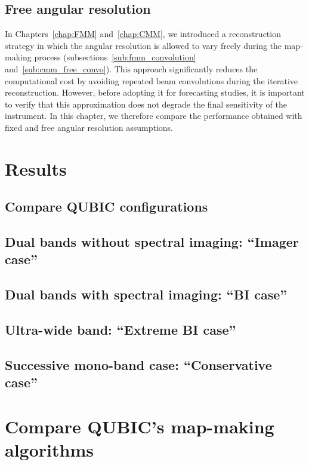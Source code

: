 \documentclass[../../thesis.tex]{subfiles}
\begin{document}
\subsection{Free angular resolution}

In Chapters~\ref{chap:FMM} and~\ref{chap:CMM}, we introduced a reconstruction strategy in which the angular resolution is allowed to vary freely during the map-making process (subsections~\ref{sub:fmm_convolution} and~\ref{sub:cmm_free_convo}). This approach significantly reduces the computational cost by avoiding repeated beam convolutions during the iterative reconstruction. However, before adopting it for forecasting studies, it is important to verify that this approximation does not degrade the final sensitivity of the instrument. In this chapter, we therefore compare the performance obtained with fixed and free angular resolution assumptions.

\section{Results}

\subsection{Compare QUBIC configurations} \label{sub:design_comparison}

\subsection{Dual bands without spectral imaging: \enquote{Imager case}}

\subsection{Dual bands with spectral imaging: \enquote{BI case}}

\subsection{Ultra-wide band: \enquote{Extreme BI case}}

\subsection{Successive mono-band case: \enquote{Conservative case}}

\section{Compare QUBIC's map-making algorithms}
\end{document}
